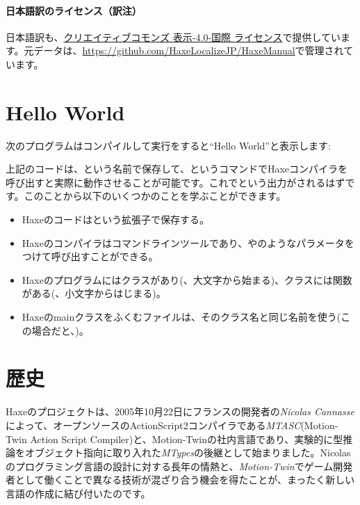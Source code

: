 \paragraph{日本語訳のライセンス（訳注）}

日本語訳も、\href{http://creativecommons.org/licenses/by/4.0/}{クリエイティブコモンズ 表示-4.0-国際 ライセンス}で提供しています。元データは、\href{https://github.com/HaxeLocalizeJP/HaxeManual}{https://github.com/HaxeLocalizeJP/HaxeManual}で管理されています。

\section{Hello World}
\label{introduction-hello-world}

次のプログラムはコンパイルして実行をすると``Hello World''と表示します:


上記のコードは、という名前で保存して、というコマンドでHaxeコンパイラを呼び出すと実際に動作させることが可能です。これでという出力がされるはずです。このことから以下のいくつかのことを学ぶことができます。


\begin{itemize}
	\item Haxeのコードはという拡張子で保存する。
	\item Haxeのコンパイラはコマンドラインツールであり、やのようなパラメータをつけて呼び出すことができる。
	\item Haxeのプログラムにはクラスがあり(、大文字から始まる)、クラスには関数がある(、小文字からはじまる)。 
	\item Haxeのmainクラスをふくむファイルは、そのクラス名と同じ名前を使う(この場合だと、)。
\end{itemize}

\section{歴史}
\label{introduction-haxe-history}

Haxeのプロジェクトは、2005年10月22日にフランスの開発者の\emph{Nicolas Cannasse}によって、オープンソースのActionScript2コンパイラである\emph{MTASC}(Motion-Twin Action Script Compiler)と、Motion-Twinの社内言語であり、実験的に型推論をオブジェクト指向に取り入れた\emph{MTypes}の後継として始まりました。Nicolasのプログラミング言語の設計に対する長年の情熱と、\emph{Motion-Twin}でゲーム開発者として働くことで異なる技術が混ざり合う機会を得たことが、まったく新しい言語の作成に結び付いたのです。

